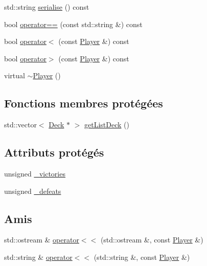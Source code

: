 \begin{DoxyCompactItemize}
\item 
std\+::string \hyperlink{classPlayer_a03a285ddda49ed0c0383b39a0a5f415b}{serialise} () const 
\item 
bool \hyperlink{classPlayer_ad595a59902a36610d2aa8d496a071f1f}{operator==} (const std\+::string \&) const 
\item 
bool \hyperlink{classPlayer_ab8344f240fbc64e17012fea952bf5821}{operator$<$} (const \hyperlink{classPlayer}{Player} \&) const 
\item 
bool \hyperlink{classPlayer_aa051d78855c6929d46593205769ae54c}{operator$>$} (const \hyperlink{classPlayer}{Player} \&) const 
\item 
virtual \hyperlink{classPlayer_a8981c201ffb2270c0b6dbd467b627376}{$\sim$\+Player} ()
\end{DoxyCompactItemize}
\subsection*{Fonctions membres protégées}
\begin{DoxyCompactItemize}
\item 
std\+::vector$<$ \hyperlink{classDeck}{Deck} $\ast$ $>$ \hyperlink{classPlayer_ad3e0232a0013556f3dc6a7cf3219c5e3}{get\+List\+Deck} ()
\end{DoxyCompactItemize}
\subsection*{Attributs protégés}
\begin{DoxyCompactItemize}
\item 
unsigned \hyperlink{classPlayer_aa9529e5da5724425ef1e94fb3f5b791f}{\+\_\+victories}
\item 
unsigned \hyperlink{classPlayer_aa3e1c71c5439841e5f3728c2a567344e}{\+\_\+defeats}
\end{DoxyCompactItemize}
\subsection*{Amis}
\begin{DoxyCompactItemize}
\item 
std\+::ostream \& \hyperlink{classPlayer_a09ccce2cf3a3aaa6af4721b94eb301d9}{operator$<$$<$} (std\+::ostream \&, const \hyperlink{classPlayer}{Player} \&)
\item 
std\+::string \& \hyperlink{classPlayer_ae196d81b10472c3768f788280aaf392b}{operator$<$$<$} (std\+::string \&, const \hyperlink{classPlayer}{Player} \&)
\end{DoxyCompactItemize}


